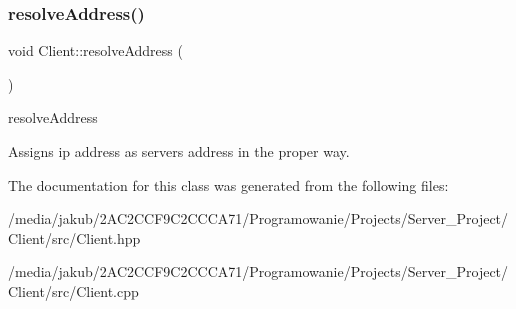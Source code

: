 \subsubsection{\texorpdfstring{resolve\+Address()}{resolveAddress()}}
{\footnotesize\ttfamily void Client\+::resolve\+Address (\begin{DoxyParamCaption}{ }\end{DoxyParamCaption})\hspace{0.3cm}{\ttfamily [private]}}



resolve\+Address 

Assigns ip address as server\textquotesingle{}s address in the proper way. 

The documentation for this class was generated from the following files\+:\begin{DoxyCompactItemize}
\item 
/media/jakub/2\+A\+C2\+C\+C\+F9\+C2\+C\+C\+C\+A71/\+Programowanie/\+Projects/\+Server\+\_\+\+Project/\+Client/src/Client.\+hpp\item 
/media/jakub/2\+A\+C2\+C\+C\+F9\+C2\+C\+C\+C\+A71/\+Programowanie/\+Projects/\+Server\+\_\+\+Project/\+Client/src/Client.\+cpp\end{DoxyCompactItemize}
